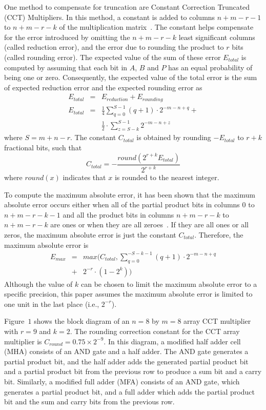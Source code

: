 One method to compensate for truncation are
Constant Correction Truncated (CCT) Multipliers.  In this method,
a constant is added to columns $n+m-r-1$ to $n+m-r-k$ of 
the multiplication matrix~\cite{schulte}.  
The constant helps compensate for the 
error introduced by omitting the $n+m-r-k$ least significant columns 
(called reduction error), and the error due to rounding the 
product to $r$ bits (called rounding error). 
The expected value of the sum of these error $E_{total}$ is computed 
by assuming that each bit in $A$, $B$ and $P$ has an equal probability
of being one or zero.  Consequently, the expected value of the total
error is the sum of expected reduction error and the expected
rounding error as
\begin{eqnarray}
E_{total} & = & E_{reduction} + E_{rounding} \nonumber \\
E_{total} & = & \frac{1}{4} \sum_{q=0}^{S-1} (q + 1) \cdot 2^{-m-n +
q} + \nonumber \\
& & \frac{1}{2} \cdot \sum_{z=S-k}^{S-1} 2^{-m-n+z}
\end{eqnarray}
where $S = m + n - r$.
The constant $C_{total}$ is obtained by rounding $-E_{total}$ to
$r+k$ fractional bits, such that
\begin{equation}
C_{total} = -\frac{round(2^{r+k} E_{total})}{2^{r+k}}
\end{equation}
where $round(x)$ indicates that $x$ is rounded to the nearest
integer. 

To compute the maximum absolute error, it has been shown that 
the maximum absolute error occurs either when all of the partial
product bits in columns $0$ to $n+m-r-k-1$ and all the product
bits in columns $n+m-r-k$ to $n+m-r-k$ are ones or when they are all
zeroes~\cite{schulte}.  
If they are all ones or all zeros, the maximum absolute error is
just the constant $C_{total}$.  
Therefore, the maximum absolute error
is
\begin{eqnarray}
E_{max} & = & max( C_{total},  
\sum_{q=0}^{-S-k-1} (q + 1) \cdot 2^{- m - n +  q} \nonumber \\
& + & 2^{-r} \cdot (1 - 2^{k}))
\end{eqnarray}
Although the value of $k$ can be chosen to limit the
maximum absolute error to a specific precision, this paper
assumes the maximum absolute error is limited to 
one unit in the last place (i.e., $2^{-r}$). 

Figure~$1$ shows the block diagram of an $n=8$ by $m=8$ array 
CCT multiplier with $r=9$ and $k=2$. 
The rounding correction constant for the CCT array multiplier is
$C_{round} = 0.75 \times 2^{-9}$.
In this diagram, a modified half adder cell (MHA) consists of 
an AND gate and a half adder. The AND gate generates a partial 
product bit, and the half adder adds the generated partial 
product bit and a partial product bit from the previous row
to produce a sum bit and a carry bit. Similarly, a modified
full adder (MFA) consists of an AND gate, which generates a partial
product bit, and a full adder which adds the partial product
bit and the sum and carry bits from the previous row. 

